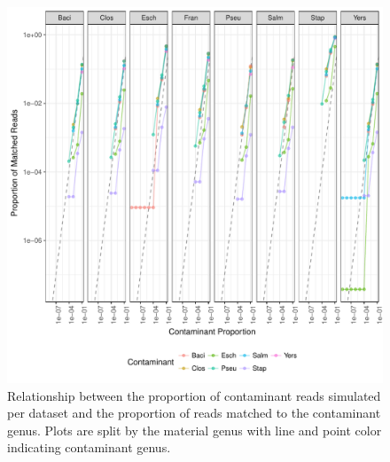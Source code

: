 \documentclass[fleqn,10pt,lineno]{wlpeerj}\usepackage[]{graphicx}\usepackage[]{color}
\makeatletter
\def\maxwidth{ %
  \ifdim\Gin@nat@width>\linewidth
    \linewidth
  \else
    \Gin@nat@width
  \fi
}
\newenvironment{knitrout}{}{} %
\makeatother
\begin{document}
\begin{knitrout}
\color{fgcolor}\begin{figure}
\includegraphics[width=\maxwidth]{figure/contam_fig-1} \caption[Relationship between the proportion of contaminant reads simulated per dataset and the proportion of reads matched to the contaminant genus]{Relationship between the proportion of contaminant reads simulated per dataset and the proportion of reads matched to the contaminant genus. Plots are split by the material genus with line and point color indicating contaminant genus.}\label{fig:contam_fig}
\end{figure}


\end{knitrout}
\end{document}
